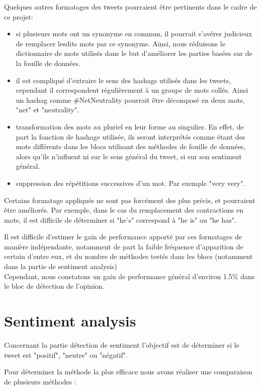 \par Quelques autres formatages des tweets pourraient être pertinents dans le cadre de ce projet: \\
\begin{itemize}
  \item si plusieurs mots ont un synonyme en commun, il pourrait s'avérer judicieux de remplacer lesdits mots par ce synonyme. Ainsi, nous réduisons le dictionnaire de mots utilisés dans le but d'améliorer les parties basées sur de la fouille de données.
  \item il est compliqué d'extraire le sens des hashags utilisés dans les tweets, cependant il correspondent régulièrement à un groupe de mots collés. Ainsi un hashag comme \#NetNeutrality pourrait être décomposé en deux mots, "net" et "neutrality".
  \item transformation des mots au pluriel en leur forme au singulier. En effet, de part la fonction de hashage utilisée, ils seront interprétés comme étant des mots différents dans les blocs utilisant des méthodes de fouille de données, alors qu'ils n'influent ni sur le sens général du tweet, si sur son sentiment général.
  \item suppression des répétitions successives d'un mot. Par exemple "very very".
\end{itemize}

\par Certains formatage appliqués ne sont pas forcément des plus précis, et pourraient être améliorés. Par exemple, dans le cas du remplacement des contractions en mots, il est difficile de déterminer si "he's" correspond à "he is" ou "he has".

\par Il est difficile d'estimer le gain de performance apporté par ces formatages de manière indépendante, notamment de part la faible fréquence d'apparition de certain d'entre eux, et du nombre de méthodes testés dans les blocs (notamment dans la partie de sentiment analysis)\\
Cependant, nous constatons un gain de performance général d'environ 1.5\% dans le bloc de détection de l'opinion.

\section{Sentiment analysis}

\par Concernant la partie détection de sentiment l'objectif est de déterminer si le tweet est "positif", "neutre" ou "négatif".
\par Pour déterminer la méthode la plus efficace nous avons réaliser une comparaison de plusieurs méthodes :\\

